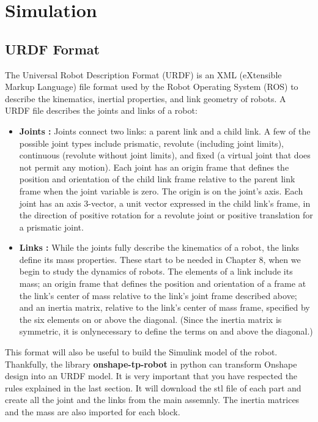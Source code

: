 \section{Simulation}\insertloftspace
\setcounter{figure}{0}\setcounter{table}{0}

\subsection{URDF Format}

The Universal Robot Description Format (URDF) is an XML (eXtensible Markup Language) file format used by the Robot Operating System (ROS) to describe the kinematics, inertial properties, and link geometry of robots. A URDF file describes the joints and links of a robot:

\begin{itemize}
    \item \textbf{Joints :} Joints connect two links: a parent link and a child link. A few of the possible joint types include prismatic, revolute (including joint limits), continuous (revolute without joint limits), and fixed (a virtual joint that does not permit any motion). Each joint has an origin frame that defines the position and orientation of the child link frame relative to the parent link frame when the joint variable is zero. The origin is on the joint's axis. Each joint has an axis 3-vector, a unit vector expressed in the child link's frame, in the direction of positive rotation for a revolute joint or positive translation for a prismatic joint.
    \item \textbf{Links :} While the joints fully describe the kinematics of a robot, the links define its mass properties. These start to be needed in Chapter 8, when we begin to study the dynamics of robots. The elements of a link include its mass; an origin frame that defines the position and orientation of a frame at the link's center of mass relative to the link's joint frame described above; and an inertia matrix, relative to the link's center of mass frame, specified by the six elements on or above the diagonal. (Since the inertia matrix is symmetric, it is onlynecessary to define the terms on and above the diagonal.)
\end{itemize}

\bigbreak
This format will also be useful to build the Simulink model of the robot. Thankfully, the library \textbf{onshape-tp-robot} in python can transform Onshape design into an URDF model. It is very important that you have respected the rules explained in the last section. It will download the stl file of each part and create all the joint and the links from the main assemnly. The inertia matrices and the mass are also imported for each block. 

